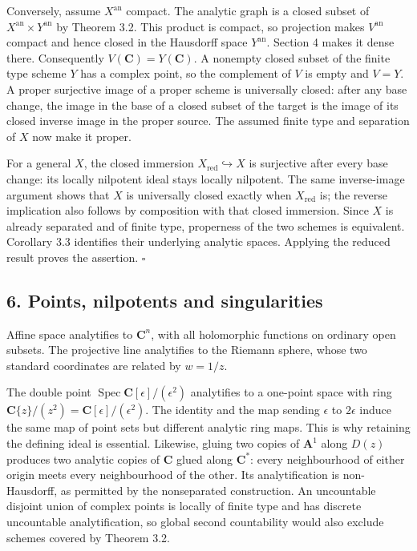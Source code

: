 \documentclass[11pt]{article}
\begin{document}
Conversely, assume \(X^{\mathrm{an}}\) compact. The analytic graph is a
closed subset of \(X^{\mathrm{an}}\times Y^{\mathrm{an}}\) by Theorem
3.2. This product is compact, so projection makes \(V^{\mathrm{an}}\)
compact and hence closed in the Hausdorff space \(Y^{\mathrm{an}}\).
Section 4 makes it dense there. Consequently
\(V(\mathbf C)=Y(\mathbf C)\). A nonempty closed subset of the finite
type scheme \(Y\) has a complex point, so the complement of \(V\) is
empty and \(V=Y\). A proper surjective image of a proper scheme is
universally closed: after any base change, the image in the base of a
closed subset of the target is the image of its closed inverse image in
the proper source. The assumed finite type and separation of \(X\) now
make it proper.

For a general \(X\), the closed immersion
\(X_{\mathrm{red}}\hookrightarrow X\) is surjective after every base
change: its locally nilpotent ideal stays locally nilpotent. The same
inverse-image argument shows that \(X\) is universally closed exactly
when \(X_{\mathrm{red}}\) is; the reverse implication also follows by
composition with that closed immersion. Since \(X\) is already separated
and of finite type, properness of the two schemes is equivalent.
Corollary 3.3 identifies their underlying analytic spaces. Applying the
reduced result proves the assertion. \(\square\)

\subsection{6. Points, nilpotents and
singularities}\label{points-nilpotents-and-singularities}

Affine space analytifies to \(\mathbf C^n\), with all holomorphic
functions on ordinary open subsets. The projective line analytifies to
the Riemann sphere, whose two standard coordinates are related by
\(w=1/z\).

The double point \(\operatorname{Spec}\mathbf C[\epsilon]/(\epsilon^2)\)
analytifies to a one-point space with ring
\(\mathbf C\{z\}/(z^2)=\mathbf C[\epsilon]/(\epsilon^2)\). The identity
and the map sending \(\epsilon\) to \(2\epsilon\) induce the same map of
point sets but different analytic ring maps. This is why retaining the
defining ideal is essential. Likewise, gluing two copies of
\(\mathbf A^1\) along \(D(z)\) produces two analytic copies of
\(\mathbf C\) glued along \(\mathbf C^*\): every neighbourhood of either
origin meets every neighbourhood of the other. Its analytification is
non-Hausdorff, as permitted by the nonseparated construction. An
uncountable disjoint union of complex points is locally of finite type
and has discrete uncountable analytification, so global second
countability would also exclude schemes covered by Theorem 3.2.
\end{document}

